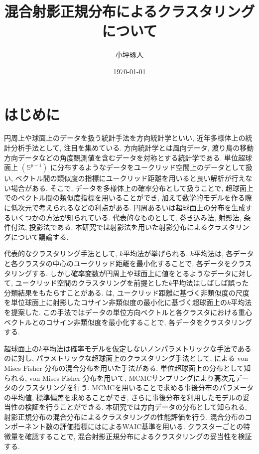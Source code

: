 \documentclass[a4j,12pt]{jarticle}
\title{混合射影正規分布によるクラスタリングについて}   %
\author{小坪琢人}   %
\date{\today}   %
\begin{document}


\setlength{\baselineskip}{20pt}   %
\tableofcontents   %
\listoffigures   %
\listoftables   %
\clearpage   %


\section{はじめに}

円周上や球面上のデータを扱う統計手法を方向統計学といい, 近年多様体上の統計分析手法として, 注目を集めている. 方向統計学とは風向データ, 渡り鳥の移動方向データなどの角度観測値を含むデータを対称とする統計学である. 単位超球面上 $(\mathbb{S}^{p-1})$ に分布するようなデータをユークリッド空間上のデータとして扱い, ベクトル間の類似度の指標にユークリッド距離を用いると良い解析が行えない場合がある. そこで, データを多様体上の確率分布として扱うことで, 超球面上でのベクトル間の類似度指標を用いることができ, 加えて数学的モデルを作る際に低次元で考えられるなどの利点がある. 円周あるいは超球面上の分布を生成するいくつかの方法が知られている. 代表的なものとして, 巻き込み法, 射影法, 条件付法, 投影法である. 本研究では射影法を用いた射影分布によるクラスタリングについて議論する.

代表的なクラスタリング手法として, $k$平均法が挙げられる. $k$平均法は, 各データと各クラスタの中心のユークリッド距離を最小化することで, 各データをクラスタリングする. しかし確率変数が円周上や球面上に値をとるようなデータに対して, ユークリッド空間のクラスタリングを前提とした$k$平均法はしばしば誤った分類結果をもたらすことがある. \citet{SKMcluster}は, ユークリッド距離に基づく非類似度の尺度を単位球面上に射影したコサイン非類似度の最小化に基づく超球面上の$k$平均法を提案した. この手法ではデータの単位方向ベクトルと各クラスタにおける重心ベクトルとのコサイン非類似度を最小化することで, 各データをクラスタリングする. 

超球面上の$k$平均法は確率モデルを仮定しないノンパラメトリックな手法であるのに対し,  パラメトリックな超球面上のクラスタリング手法として, \citet{Gopal}による von Mises Fisher 分布の混合分布を用いた手法がある. 単位超球面上の分布として知られる, von Mises Fisher 分布を用いて, MCMCサンプリングにより高次元データのクラスタリングを行う. MCMCを用いることで求める事後分布のパラメータの平均値, 標準偏差を求めることができ, さらに事後分布を利用したモデルの妥当性の検証を行うことができる. 本研究では方向データの分布として知られる, 射影正規分布の混合分布によるクラスタリングの性能評価を行う. 混合分布のコンポーネント数の評価指標には\citet{WAIC}によるWAIC基準を用いる. クラスターごとの特徴量を確認することで, 混合射影正規分布によるクラスタリングの妥当性を検証する.
\end{document}
